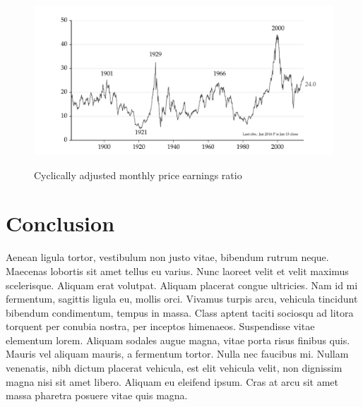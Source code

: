 \documentclass[11pt,a4paper]{article}
\begin{document}
\begin{figure}
\caption{Cyclically adjusted monthly price earnings ratio}
	\centering
	\includegraphics[trim=0cm 0cm 0cm 0cm, clip=true, totalheight=0.3\textheight]{figures/pe_ratio}
	\label{fig:shiller_pe}
\end{figure}

\section{Conclusion}

Aenean ligula tortor, vestibulum non justo vitae, bibendum rutrum neque. Maecenas lobortis sit amet tellus eu varius. Nunc laoreet velit et velit maximus scelerisque. Aliquam erat volutpat. Aliquam placerat congue ultricies. Nam id mi fermentum, sagittis ligula eu, mollis orci. Vivamus turpis arcu, vehicula tincidunt bibendum condimentum, tempus in massa. Class aptent taciti sociosqu ad litora torquent per conubia nostra, per inceptos himenaeos. Suspendisse vitae elementum lorem. Aliquam sodales augue magna, vitae porta risus finibus quis. Mauris vel aliquam mauris, a fermentum tortor. Nulla nec faucibus mi. Nullam venenatis, nibh dictum placerat vehicula, est elit vehicula velit, non dignissim magna nisi sit amet libero. Aliquam eu eleifend ipsum. Cras at arcu sit amet massa pharetra posuere vitae quis magna.
\end{document}
